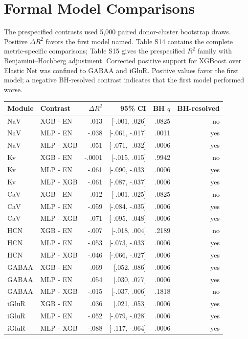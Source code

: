 \documentclass[11pt]{article}
\newcommand{\tablefont}{\fontsize{9.5}{11.2}\selectfont}
\newcommand{\sourcecaption}[1]{\Needspace{10\baselineskip}\vspace{2pt}{\small\bfseries #1}\par\vspace{2pt}}
\begin{document}
\section{Formal Model Comparisons}
The prespecified contrasts used 5,000 paired donor-cluster bootstrap draws. Positive $\Delta R^2$ favors the first model named. Table S14 contains the complete metric-specific comparisons; Table S15 gives the prespecified $R^2$ family with Benjamini--Hochberg adjustment. Corrected positive support for XGBoost over Elastic Net was confined to GABAA and iGluR. Positive values favor the first model; a negative BH-resolved contrast indicates that the first model performed worse.

\sourcecaption{Paired donor-cluster bootstrap comparisons for pooled OOF $R^2$ (Table S15).}
\begin{center}\tablefont
\begin{tabular}{llrrrr}
\toprule
Module & Contrast & $\Delta R^2$ & 95\% CI & BH $q$ & BH-resolved \\
\midrule
NaV & XGB - EN & .013 & [-.001, .026] & .0825 & no \\
NaV & MLP - EN & -.038 & [-.061, -.017] & .0011 & yes \\
NaV & MLP - XGB & -.051 & [-.071, -.032] & .0006 & yes \\
Kv & XGB - EN & -.0001 & [-.015, .015] & .9942 & no \\
Kv & MLP - EN & -.061 & [-.090, -.033] & .0006 & yes \\
Kv & MLP - XGB & -.061 & [-.087, -.037] & .0006 & yes \\
CaV & XGB - EN & .012 & [-.001, .025] & .0825 & no \\
CaV & MLP - EN & -.059 & [-.084, -.035] & .0006 & yes \\
CaV & MLP - XGB & -.071 & [-.095, -.048] & .0006 & yes \\
HCN & XGB - EN & -.007 & [-.018, .004] & .2189 & no \\
HCN & MLP - EN & -.053 & [-.073, -.033] & .0006 & yes \\
HCN & MLP - XGB & -.046 & [-.066, -.027] & .0006 & yes \\
GABAA & XGB - EN & .069 & [.052, .086] & .0006 & yes \\
GABAA & MLP - EN & .054 & [.030, .077] & .0006 & yes \\
GABAA & MLP - XGB & -.015 & [-.037, .006] & .1818 & no \\
iGluR & XGB - EN & .036 & [.021, .053] & .0006 & yes \\
iGluR & MLP - EN & -.052 & [-.079, -.028] & .0006 & yes \\
iGluR & MLP - XGB & -.088 & [-.117, -.064] & .0006 & yes \\
\bottomrule
\end{tabular}
\end{center}
\end{document}
